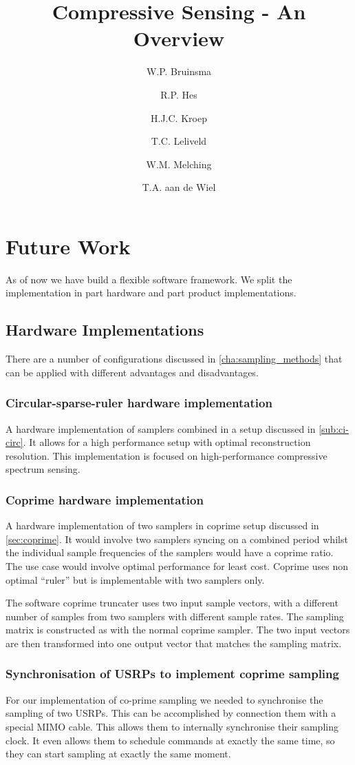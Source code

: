 \documentclass[a4paper, openany, oneside]{memoir}
\title{Compressive Sensing - An Overview}
\author{W.P. Bruinsma \and R.P. Hes \and H.J.C. Kroep \and T.C. Leliveld \and W.M. Melching \and T.A. aan de Wiel}
\begin{document}
\chapter{Future Work}
\label{cha:futurework}
As of now we have build a flexible software framework. We split the implementation in part hardware and part product implementations.

\section{Hardware Implementations}
\label{sec:hardware_implementations}
There are a number of configurations discussed in \cref{cha:sampling_methods} that can be applied with different advantages and disadvantages.

\subsection{Circular-sparse-ruler hardware implementation}
\label{sub:minimal_sparse_ruler_hardware_implementation}
A hardware implementation of samplers combined in a setup discussed in \cref{sub:ci-circ}. It allows for a high performance setup with optimal reconstruction resolution. This implementation is focused on high-performance compressive spectrum sensing.

\subsection{Coprime hardware implementation}
\label{sub:coprime_hardwa}
A hardware implementation of two samplers in coprime setup discussed in \cref{sec:coprime}. It would involve two samplers syncing on a combined period whilst the individual sample frequencies of the samplers would have a coprime ratio. The use case would involve optimal performance for least cost. Coprime uses non optimal ``ruler'' but is implementable with two samplers only.

The software coprime truncater uses two input sample vectors, with a different number of samples from two samplers with different sample rates. The sampling matrix is constructed as with the normal coprime sampler. The two input vectors are then transformed into one output vector that matches the sampling matrix.

\subsection{Synchronisation of USRPs to implement coprime sampling}
For our implementation of co-prime sampling we needed to synchronise the sampling of two USRPs. This can be accomplished by connection them with a special MIMO cable. This allows them to internally synchronise their sampling clock. It even allows them to schedule commands at exactly the same time, so they can start sampling at exactly the same moment.
\end{document}

